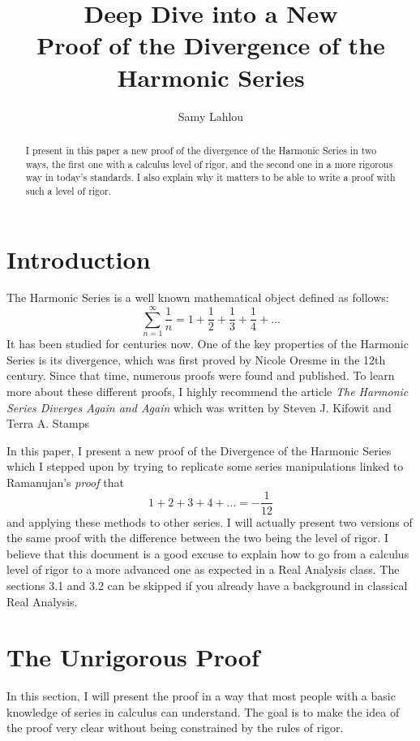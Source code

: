 \documentclass[12pt]{article}
\title{Deep Dive into a New \\ Proof of the Divergence of the Harmonic Series}
\author{Samy Lahlou}
\date{}
\theoremstyle{definition}
\newcounter{prop}[section]
\begin{document}
\maketitle

\begin{abstract}
    I present in this paper a new proof of the divergence of the Harmonic Series in two ways, the first one with a calculus level of rigor, and the second one in a more rigorous way in today's standards. I also explain why it matters to be able to write a proof with such a level of rigor.
\end{abstract}

\tableofcontents

\newpage

\section{Introduction}
The Harmonic Series is a well known mathematical object defined as follows:
$$\sum_{n=1}^{\infty}\frac{1}{n} = 1 + \frac{1}{2} + \frac{1}{3} + \frac{1}{4} + ...$$
It has been studied for centuries now. One of the key properties of the Harmonic Series is its divergence, which was first proved by Nicole Oresme in the 12th century. Since that time, numerous proofs were found and published. To learn more about these different proofs, I highly recommend the article \textit{The Harmonic Series Diverges Again and Again} which was written by Steven J. Kifowit and Terra A. Stamps \cite{harmonicseries} 

In this paper, I present a new proof of the Divergence of the Harmonic Series which I stepped upon by trying to replicate some series manipulations linked to Ramanujan's \textit{proof} that
$$1 + 2 + 3 + 4 + ... = -\frac{1}{12}$$
and applying these methods to other series. I will actually present two versions of the same proof with the difference between the two being the level of rigor. I believe that this document is a good excuse to explain how to go from a calculus level of rigor to a more advanced one as expected in a Real Analysis class. The sections 3.1 and 3.2 can be skipped if you already have a background in classical Real Analysis.

\section{The Unrigorous Proof}

In this section, I will present the proof in a way that most people with a basic knowledge of series in calculus can understand. The goal is to make the idea of the proof very clear without being constrained by the rules of rigor. 
\end{document}
